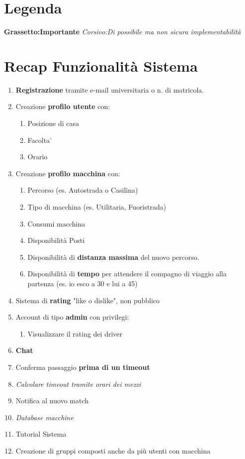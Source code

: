 \documentclass[12pt]{article}
\begin{document}
	\section*{Legenda}
		\textbf{Grassetto:Importante}\linebreak
		\emph{Corsivo:Di possibile ma non sicura implementabilità}
	
	\section*{Recap Funzionalità Sistema}
	\begin{enumerate}
		\item \textbf{Registrazione} tramite e-mail universitaria o n. di matricola.
		\item Creazione \textbf{profilo utente} con: 
			\begin{enumerate}
				\item Posizione di casa
				\item Facolta'
				\item Orario
			\end{enumerate}
		\item Creazione \textbf{profilo macchina} con:
			\begin{enumerate}
				\item Percorso (es. Autostrada o Casilina)
				\item Tipo di macchina (es. Utilitaria, Fuoristrada)
				\item Consumi macchina
				\item Disponibilità Posti
				\item Disponibilità di \textbf{distanza massima} del nuovo percorso.
				\item Disponibilità di \textbf{tempo} per attendere il compagno di viaggio alla partenza (es. io esco a 30 e lui a 45)
			\end{enumerate}
		\item Sistema di \textbf{rating} "like o dislike", non pubblico
		\item Account di tipo \textbf{admin} con privilegi:
			\begin{enumerate}
				\item Visualizzare il rating dei driver
			\end{enumerate}
		\item \textbf{Chat}
		\item Conferma passaggio \textbf{prima di un timeout}
		\item \emph{Calcolare timeout tramite orari dei mezzi}
		\item Notifica al nuovo match
		\item \emph{Database macchine}
		\item Tutorial Sistema
		\item Creazione di gruppi composti anche da più utenti con macchina
	\end{enumerate}
	
	
\end{document}
